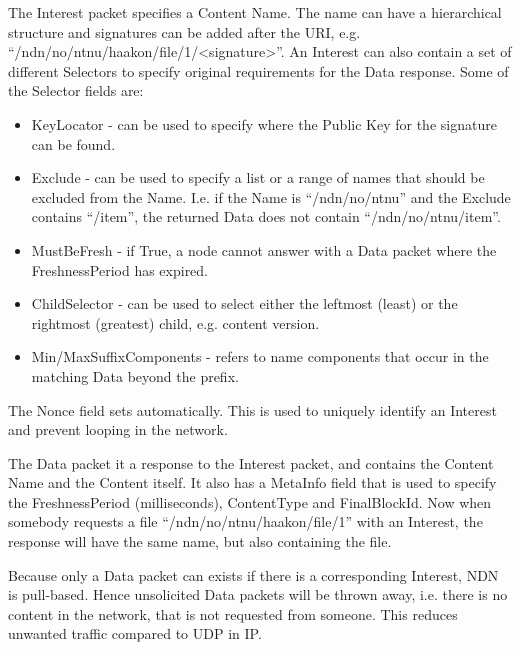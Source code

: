 The Interest packet specifies a Content Name. 
The name can have a hierarchical structure and signatures can be added after the \gls{URI}, e.g. ``/ndn/no/ntnu/haakon/file/1/<signature>''.
An Interest can also contain a set of different Selectors to specify original requirements for the Data response. 
Some of the Selector fields are:
\begin{itemize}
  \item KeyLocator - can be used to specify where the Public Key for the signature can be found.
  \item Exclude - can be used to specify a list or a range of names that should be excluded from the Name. 
  I.e. if the Name is ``/ndn/no/ntnu'' and the Exclude contains ``/item'', the returned Data does not contain ``/ndn/no/ntnu/item''.
  \item MustBeFresh - if True, a node cannot answer with a Data packet where the FreshnessPeriod has expired.
  \item ChildSelector - can be used to select either the leftmost (least) or the rightmost (greatest) child, e.g. content version. 
  \item Min/MaxSuffixComponents - refers to name components that occur in the matching Data beyond the prefix. 
\end{itemize}
The Nonce field sets automatically. 
This is used to uniquely identify an Interest and prevent looping in the network.

The Data packet it a response to the Interest packet, and contains the Content Name and the Content itself.
It also has a MetaInfo field that is used to specify the FreshnessPeriod (milliseconds), ContentType and FinalBlockId. 
Now when somebody requests a file ``/ndn/no/ntnu/haakon/file/1'' with an Interest, the response will have the same name, but also containing the file.

Because only a Data packet can exists if there is a corresponding Interest, \gls{NDN} is pull-based.
Hence unsolicited Data packets will be thrown away, i.e. there is no content in the network, that is not requested from someone.
This reduces unwanted traffic compared to \gls{UDP} in \gls{IP}.

